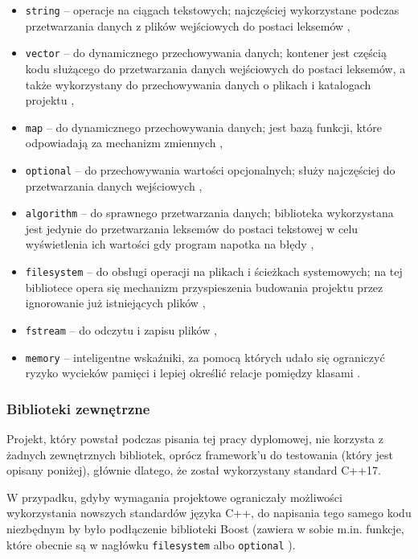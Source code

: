 \begin{itemize}
    \item \texttt{string} -- operacje na ciągach tekstowych; najczęściej wykorzystane podczas przetwarzania danych z plików wejściowych do postaci leksemów \cite{cpp_string}, 
    \item \texttt{vector} -- do dynamicznego przechowywania danych; kontener jest częścią kodu służącego do przetwarzania danych wejściowych do postaci leksemów, a także wykorzystany do przechowywania danych o plikach i katalogach projektu \cite{cpp_vector}, 
    \item \texttt{map} -- do dynamicznego przechowywania danych; jest bazą funkcji, które odpowiadają za mechanizm zmiennych \cite{cpp_map},
    \item \texttt{optional} -- do przechowywania wartości opcjonalnych; służy najczęściej do przetwarzania danych wejściowych \cite{cpp_optional}, 
    \item \texttt{algorithm} -- do sprawnego przetwarzania danych; biblioteka wykorzystana jest jedynie do przetwarzania leksemów do postaci tekstowej w celu wyświetlenia ich wartości gdy program napotka na błędy \cite{cpp_algorithm},
    \item \texttt{filesystem} -- do obsługi operacji na plikach i ścieżkach systemowych; na tej bibliotece opera się mechanizm przyspieszenia budowania projektu przez ignorowanie już istniejących plików \cite{cpp_filesystem}, 
    \item \texttt{fstream} -- do odczytu i zapisu plików \cite{cpp_fstream},
    \item \texttt{memory} -- inteligentne wskaźniki, za pomocą których udało się ograniczyć ryzyko wycieków pamięci i lepiej określić relacje pomiędzy klasami \cite{cpp_memory}.
\end{itemize}

\subsubsection{Biblioteki zewnętrzne}
Projekt, który powstał podczas pisania tej pracy dyplomowej, nie korzysta z żadnych zewnętrznych bibliotek, oprócz framework'u do testowania (który jest opisany poniżej), głównie dlatego, że został wykorzystany standard C++17. 

W przypadku, gdyby wymagania projektowe ograniczały możliwości wykorzystania nowszych standardów języka C++, do napisania tego samego kodu niezbędnym by było podłączenie biblioteki Boost (zawiera w sobie m.in. funkcje, które obecnie są w nagłówku \texttt{filesystem} \cite{cpp_filesystem} albo \texttt{optional} \cite{cpp_optional}).

